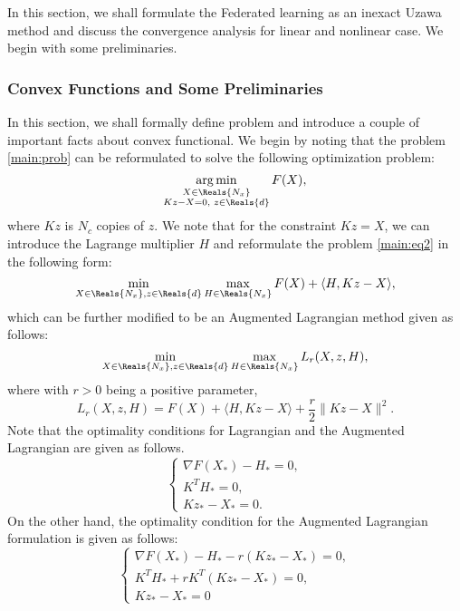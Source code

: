 In this section, we shall formulate the Federated learning as an inexact Uzawa method \cite{bramble1997analysis} and discuss the convergence analysis for linear and nonlinear case. We begin with some preliminaries. 

\subsubsection{Convex Functions and Some  Preliminaries}\label{problem} 
In this section, we shall formally define problem and introduce a couple of important facts about convex functional. We begin by noting that the problem \eqref{main:prob} can be reformulated to solve the following optimization problem: 
\begin{equation}\label{main:eq2} 
\mathop{\arg \min }_{\substack{X \in \Reals{ N_x} \\ K z - X = 0, \,\, z \in \Reals{d}}} F(X), 
\end{equation}
where $Kz$ is $N_c$ copies of $z$. We note that for the constraint $Kz = X$, we can introduce the Lagrange multiplier $H$ and reformulate the problem \eqref{main:eq2} in the following form: 
\begin{equation}
\min_{X \in \Reals{N_x}, z \in \Reals{d}} \max_{H \in \Reals{N_x}} F(X) + \langle H, Kz - X \rangle,  
\end{equation}
which can be further modified to be an Augmented Lagrangian method given as follows: 
\begin{equation}
\min_{X \in \Reals{N_x}, z \in \Reals{d}} \max_{H \in \Reals{N_x}} L_r(X,z,H),   
\end{equation}
where with $r > 0$ being a positive parameter, 
\begin{equation}\label{lagrange} 
L_r(X,z,H) = F(X) + \langle H, K z - X \rangle + \frac{r}{2} \|Kz - X\|^2. 
\end{equation}
Note that the optimality conditions for Lagrangian and the Augmented Lagrangian are given as follows. 
\begin{equation}\label{Lag}
\begin{cases}
\nabla F(X_*) - H_* = 0,\\
K^T H_* = 0, \\
Kz_* - X_*= 0. 
\end{cases}
\end{equation}
On the other hand, the optimality condition for the Augmented Lagrangian formulation is given as follows: 
\begin{equation}
\label{augLag}
\begin{cases}
\nabla F(X_*) - H_* - r (Kz_* - X_*) = 0, \\
K^T H_*  + r K^T(Kz_* -X_*) = 0,\\
K z_* - X_* = 0
\end{cases}
\end{equation}  
